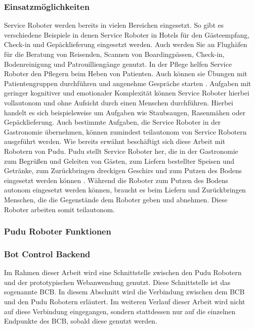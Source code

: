 \subsubsection{Einsatzmöglichkeiten}
Service Roboter werden bereits in vielen Bereichen eingesetzt. So gibt es verschiedene Beispiele in denen Service Roboter in Hotels für den Gästeempfang, Check-in und Gepäcklieferung eingesetzt werden. Auch werden Sie an Flughäfen für die Beratung von Reisenden, Scannen von Boardingpässen, Check-in, Bodenreinigung und Patrouilliengänge genutzt. In der Pflege helfen Service Roboter den Pflegern beim Heben von Patienten. Auch können sie Übungen mit Patientengruppen durchführen und angenehme Gespräche starten \cite[S.~425-427]{Paluch2020}. Aufgaben mit geringer kognitiver und emotionaler Komplexität können Service Roboter hierbei vollautonom und ohne Aufsicht durch einen Menschen durchführen\cite[S.~429]{Paluch2020}. Hierbei handelt es sich beispielsweise um Aufgaben wie Staubsaugen, Rasenmähen oder Gepäcklieferung. Auch bestimmte Aufgaben, die Service Roboter in der Gastronomie übernehmen, können zumindest teilautonom von Service Robotern ausgeführt werden. Wie bereits erwähnt beschäftigt sich diese Arbeit mit Robotern von Pudu. Pudu stellt Service Roboter her, die in der Gastronomie zum Begrüßen und Geleiten von Gästen, zum Liefern bestellter Speisen und Getränke, zum Zurückbringen dreckigen Geschirs und zum Putzen des Bodens eingesetzt werden können \cite{PUDU2024}. Während die Roboter zum Putzen des Bodens autonom eingesetzt werden können, braucht es beim Liefern und Zurückbringen Menschen, die die Gegenstände dem Roboter geben und abnehmen. Diese Roboter arbeiten somit teilautonom.

\subsubsection{Pudu Roboter Funktionen}

\subsubsection{Bot Control Backend}
Im Rahmen dieser Arbeit wird eine Schnittstelle zwischen den Pudu Robotern und der prototypischen Webanwendung genutzt. Diese Schnittstelle ist das sogenannte \ac{BCB}. In diesem Abschnitt wird die Verbindung zwischen dem \ac{BCB} und den Pudu Robotern erläutert. Im weiteren Verlauf dieser Arbeit wird nicht auf diese Verbindung eingegangen, sondern stattdessen nur auf die einzelnen Endpunkte des \ac{BCB}, sobald diese genutzt werden.

